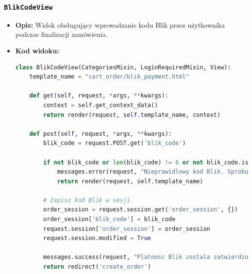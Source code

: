 \documentclass[12pt,a4paper,oneside]{article}
\theoremstyle{definition}
\numberwithin{equation}{section}
\begin{document}
\subsubsection*{\texttt{BlikCodeView}}
\begin{itemize}
    \item \textbf{Opis:} Widok obsługujący wprowadzanie kodu Blik przez użytkownika podczas finalizacji zamówienia.
    \item \textbf{Kod widoku:}
\begin{lstlisting}[language=Python, caption=Kod widoku BlikCodeView]
class BlikCodeView(CategoriesMixin, LoginRequiredMixin, View):
    template_name = "cart_order/blik_payment.html"

    def get(self, request, *args, **kwargs):
        context = self.get_context_data()
        return render(request, self.template_name, context)

    def post(self, request, *args, **kwargs):
        blik_code = request.POST.get('blik_code')

        if not blik_code or len(blik_code) != 6 or not blik_code.isdigit():
            messages.error(request, "Nieprawidlowy kod Blik. Sprobuj ponownie.")
            return render(request, self.template_name)

        # Zapisz kod Blik w sesji
        order_session = request.session.get('order_session', {})
        order_session['blik_code'] = blik_code
        request.session['order_session'] = order_session
        request.session.modified = True

        messages.success(request, "Platnosc Blik zostala zatwierdzona.")
        return redirect('create_order')
\end{lstlisting}


\end{itemize}
\end{document}

